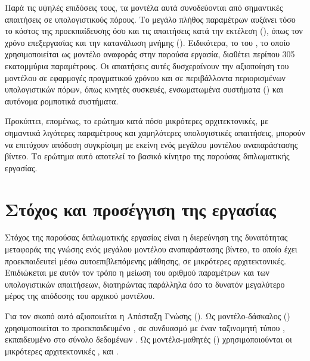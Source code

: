 Παρά τις υψηλές επιδόσεις τους, τα μοντέλα αυτά συνοδεύονται από σημαντικές
απαιτήσεις σε υπολογιστικούς πόρους. Το μεγάλο πλήθος παραμέτρων αυξάνει τόσο
το κόστος της προεκπαίδευσης όσο και τις απαιτήσεις κατά την εκτέλεση
(), όπως τον χρόνο επεξεργασίας και την κατανάλωση μνήμης
 (). Ειδικότερα, το  του , το
οποίο χρησιμοποιείται ως μοντέλο αναφοράς στην παρούσα εργασία, διαθέτει περίπου
305 εκατομμύρια παραμέτρους. Οι απαιτήσεις αυτές δυσχεραίνουν την αξιοποίηση του μοντέλου σε εφαρμογές
πραγματικού χρόνου και σε περιβάλλοντα περιορισμένων υπολογιστικών πόρων,
όπως κινητές συσκευές, ενσωματωμένα συστήματα () και
αυτόνομα ρομποτικά συστήματα.

Προκύπτει, επομένως, το ερώτημα κατά πόσο μικρότερες αρχιτεκτονικές, με
σημαντικά λιγότερες παραμέτρους και χαμηλότερες υπολογιστικές απαιτήσεις,
μπορούν να επιτύχουν απόδοση συγκρίσιμη με εκείνη ενός μεγάλου μοντέλου
αναπαράστασης βίντεο. Το ερώτημα αυτό αποτελεί το βασικό κίνητρο της παρούσας
διπλωματικής εργασίας.

\section{Στόχος και προσέγγιση της εργασίας}
\label{sec:intro-approach}

Στόχος της παρούσας διπλωματικής εργασίας είναι η διερεύνηση της δυνατότητας
μεταφοράς της γνώσης ενός μεγάλου μοντέλου αναπαράστασης βίντεο, το οποίο έχει
προεκπαιδευτεί μέσω αυτοεπιβλεπόμενης μάθησης, σε μικρότερες αρχιτεκτονικές.
Επιδιώκεται με αυτόν τον τρόπο η μείωση του αριθμού παραμέτρων και των
υπολογιστικών απαιτήσεων, διατηρώντας παράλληλα όσο το δυνατόν μεγαλύτερο
μέρος της απόδοσης του αρχικού μοντέλου.

Για τον σκοπό αυτό αξιοποιείται η Απόσταξη Γνώσης
(). Ως μοντέλο-δάσκαλος ()
χρησιμοποιείται το προεκπαιδευμένο , σε συνδυασμό με έναν
ταξινομητή τύπου , εκπαιδευμένο στο σύνολο δεδομένων
. Ως μοντέλα-μαθητές () χρησιμοποιούνται οι μικρότερες
αρχιτεκτονικές ,  και .

